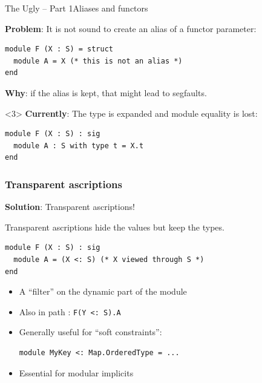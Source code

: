 \documentclass[aspectratio=169,dvipsnames,svgnames,10pt]{beamer}
\begin{document}
\begin{frame}{The Ugly -- Part 1\hfill Aliases and functors}
  
  {\bf Problem}: It is not sound to create an alias of a functor parameter:
\begin{verbatim}
module F (X : S) = struct
  module A = X (* this is not an alias *)
end
\end{verbatim}
  {\bf Why}: if the alias is kept, that might lead to segfaults.

    \begin{onlyenv}<3>
  {\bf Currently}: The type is expanded and module equality is lost:
\begin{verbatim}
module F (X : S) : sig
  module A : S with type t = X.t
end
\end{verbatim}
\end{onlyenv}
  
\end{frame}

\begin{frame}[fragile]
  \frametitle{Transparent ascriptions}

  {\bf Solution}: Transparent ascriptions!

  Transparent ascriptions hide the values but keep the types.
\begin{verbatim}
module F (X : S) : sig
  module A = (X <: S) (* X viewed through S *)
end
\end{verbatim}

  \pause
  \begin{itemize}
  \item A ``filter'' on the dynamic part of the module
  \item Also in path : \texttt{F(Y <:\ S).A}
  \item Generally useful for ``soft constraints'':
\begin{verbatim}
module MyKey <: Map.OrderedType = ...
\end{verbatim}
  \item Essential for modular implicits
  \end{itemize}
  
\end{frame}
\end{document}
